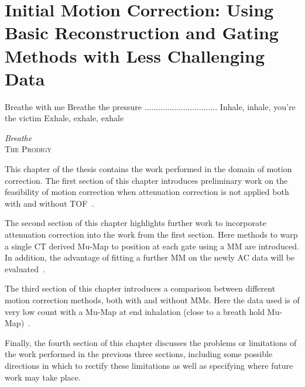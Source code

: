 \chapter{Initial Motion Correction: Using Basic Reconstruction and Gating Methods with Less Challenging Data} \label{sec:initial_motion_correction_using_basic_reconstruction_and_gating_methods_with_less_challenging_data}
    \vspace*{\fill}
    \setlength{\epigraphwidth}{0.4\linewidth}
    \renewcommand{\epigraphflush}{flushright}
    \renewcommand{\epigraphsize}{\footnotesize}
    \epigraph{Breathe with me\newline
              Breathe the pressure\newline
              ................................\newline
              Inhale, inhale, you're the victim\newline
              Exhale, exhale, exhale}%
              {\textit{Breathe}\\ \textsc{The Prodigy}}
    
    \newpage
    
        This chapter of the thesis contains the work performed in the domain of motion correction. The first section of this chapter introduces preliminary work on the feasibility of motion correction when attenuation correction is not applied both with and without \gls{TOF}~\parencite{Whitehead2019ImpactPET}.
        
        The second section of this chapter highlights further work to incorporate attenuation correction into the work from the first section. Here methods to warp a single \gls{CT} derived \gls{Mu-Map} to position at each gate using a \gls{MM} are introduced. In addition, the advantage of fitting a further \gls{MM} on the newly \gls{AC} data will be evaluated~\parencite{Whitehead2020PET/CTFields}.
        
        The third section of this chapter introduces a comparison between different motion correction methods, both with and without \glspl{MM}. Here the data used is of very low count with a \gls{Mu-Map} at end inhalation (close to a breath hold \gls{Mu-Map})~\parencite{Whitehead2021ComparisonMap}.
        
        Finally, the fourth section of this chapter discusses the problems or limitations of the work performed in the previous three sections, including some possible directions in which to rectify these limitations as well as specifying where future work may take place.
    
